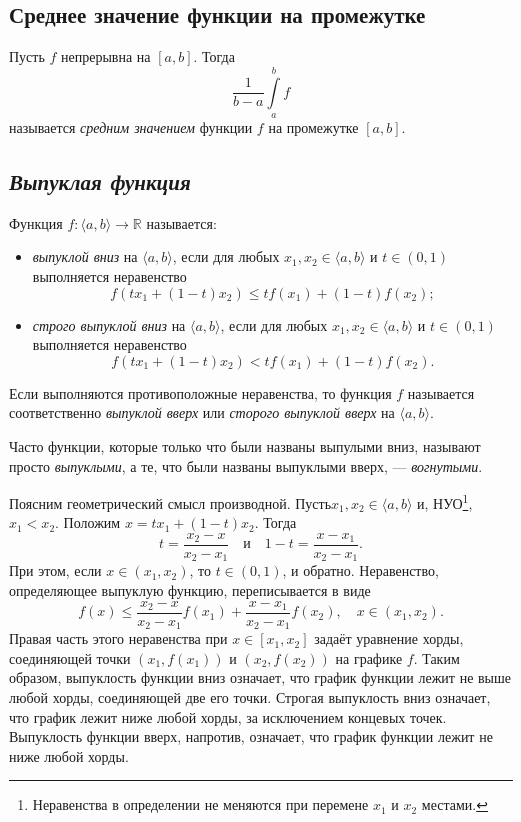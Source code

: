 \subsection{Среднее значение функции на промежутке}

\hypertarget{average}{}
\begin{definition}
	Пусть $f$ непрерывна на $[a, b]$. Тогда \[
		\dfrac1{b - a}\int\limits_a^b f
	\]
	называется \textit{средним значением} функции $f$ на промежутке $[a, b]$.
\end{definition}

\subsection{\itshape Выпуклая функция}

\begin{definition}
	Функция \(f \colon \langle a, b \rangle \to \mathbb{R}\) называется:
	\begin{itemize}
		\item \textit{выпуклой вниз} на \(\langle a, b \rangle\), если для любых \(x_1, x_2 \in \langle a, b \rangle\) и \(t \in (0, 1)\) выполняется неравенство \[
		f(t x_1 + (1 - t) x_2) \leqslant t f(x_1) + (1 - t) f(x_2);
		\]
		\item \textit{строго выпуклой вниз} на \(\langle a, b \rangle\), если для любых \(x_1, x_2 \in \langle a, b \rangle\) и \(t \in (0, 1)\) выполняется неравенство \[
		f(t x_1 + (1 - t) x_2) < t f(x_1) + (1 - t) f(x_2).
		\]
	\end{itemize}
	
	Если выполняются противоположные неравенства, то функция \(f\) называется соответственно \textit{выпуклой вверх} или \textit{сторого выпуклой вверх} на \(\langle a, b \rangle\).
	
	Часто функции, которые только что были названы выпулыми вниз, называют просто \textit{выпуклыми}, а те, что были названы выпуклыми вверх, --- \textit{вогнутыми}.
	
	Поясним геометрический смысл производной. Пусть\(x_1, x_2 \in \langle a, b \rangle\) и, НУО\footnote{Неравенства в определении не меняются при перемене \(x_1\) и \(x_2\) местами.}, \(x_1 < x_2\). Положим \(x = t x_1 + (1 - t) x_2\). Тогда \[
		t = \frac{x_2 - x}{x_2 - x_1} \quad \text{и} \quad 1 - t = \frac{x - x_1}{x_2 - x_1}.
	\]
	При этом, если \(x \in (x_1, x_2)\), то \(t \in (0, 1)\), и обратно. Неравенство, определяющее выпуклую функцию, переписывается в виде \[
		f(x) \leqslant \frac{x_2 - x}{x_2 - x_1} f(x_1) + \frac{x - x_1}{x_2 - x_1} f(x_2), \quad x \in (x_1, x_2).
	\]
	Правая часть этого неравенства при \(x \in [x_1, x_2]\) задаёт уравнение хорды, соединяющей точки \((x_1, f(x_1))\) и \((x_2, f(x_2))\) на графике \(f\). Таким образом, выпуклость функции вниз означает, что график функции лежит не выше любой хорды, соединяющей две его точки. Строгая выпуклость вниз означает, что график лежит ниже любой хорды, за исключением концевых точек. Выпуклость функции вверх, напротив, означает, что график функции лежит не ниже любой хорды.
\end{definition}

